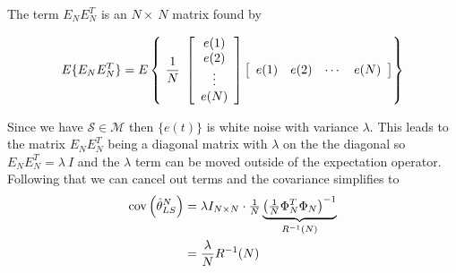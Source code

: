 The term $E_N E_N^T$ is an $N\times~N$ matrix found by

\begin{equation*}
E\{E_N E_N^T\} = E\left\lbrace~\onen~\left[\begin{array}{c} e(1) \\ e(2) \\ \vdots \\ e(N) \end{array}\right] \left[\begin{array}{c c c c} e(1) & e(2) & \cdots & e(N) \end{array}\right]\right\rbrace%
\end{equation*}

Since we have $\mathcal{S}\in\mathcal{M}$ then $\{e (t)\}$ is white noise with variance $\lambda$.
This leads to the matrix $E_N E_N^T$ being a diagonal matrix with $\lambda$ on the the diagonal so $E_N E_N^T=\lambda~I$ and the $\lambda$ term can be moved outside of the expectation operator.
Following that we can cancel out terms and the covariance simplifies to
\begin{align*}
\text{cov}\left(\hat{\theta}_{LS}^N\right) &= \lambda I_{N\times N}\cdot \tfrac{1}{N}\underbrace{{\left(\tfrac{1}{N}\Phi_N^T\Phi_N\right)}^{-1}}_{R^{-1}(N)} \\
&= \frac{\lambda}{N}R^{-1}(N)
\end{align*}

